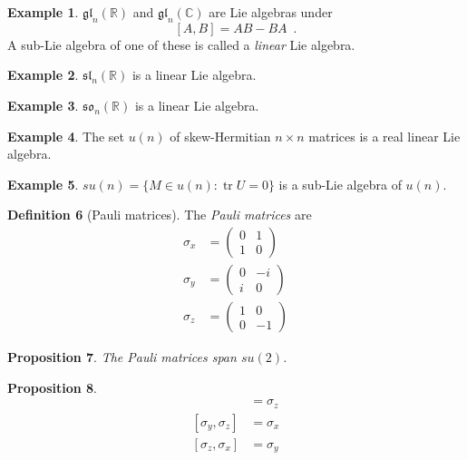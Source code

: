 \documentclass{book}
\newtheorem{prop}{Proposition}[chapter]
\theoremstyle{definition}
\newtheorem{df}[prop]{Definition}
\newtheorem{ex}[prop]{Example}
\newcommand{\gl}[2]{\ensuremath{\mathfrak{gl}_{#1} \left( {#2} \right)}}
\renewcommand{\sl}[2]{\ensuremath{\mathfrak{sl}_{#1} \left( {#2} \right)}}
\newcommand{\so}[2]{\ensuremath{\mathfrak{so}_{#1} \left( {#2} \right)}}
\newcommand{\tr}{\ensuremath{\operatorname{tr}}}
\begin{document}
\begin{ex}
$\gl
{n}{\mathbb{R}}$ and $\gl{n}{\mathbb{C}}$ are Lie algebras under
\[ [A,B] = AB - BA \enspace . \]
A sub-Lie algebra of one of these is called a \emph{linear} Lie algebra.
\end{ex}

\begin{ex}
$\sl{n}{\mathbb{R}}$ is a linear Lie algebra.
\end{ex}

\begin{ex}
$\so{n}{\mathbb{R}}$ is a linear Lie algebra.
\end{ex}

\begin{ex}
The set $u(n)$ of skew-Hermitian $n \times n$ matrices is a real linear Lie algebra.
\end{ex}

\begin{ex}
$su(n) = \{ M \in u(n) : \tr U = 0 \}$ is a sub-Lie algebra of $u(n)$.
\end{ex}

\begin{df}[Pauli matrices]
The \emph{Pauli matrices} are
\begin{align*}
\sigma_x & = \left( \begin{array}{cc}
0 & 1 \\ 1 & 0
\end{array} \right) \\
\sigma_y & = \left( \begin{array}{cc}
0 & -i \\ i & 0
\end{array} \right) \\
\sigma_z & = \left( \begin{array}{cc}
1 & 0 \\ 0 & -1
\end{array} \right)
\end{align*}
\end{df}

\begin{prop}
The Pauli matrices span $su(2)$.
\end{prop}

\begin{prop}
\begin{align*}
[\sigma_x, \sigma_y] & = \sigma_z \\
[\sigma_y, \sigma_z] & = \sigma_x \\
[\sigma_z, \sigma_x] & = \sigma_y
\end{align*}
\end{prop}
\end{document}
